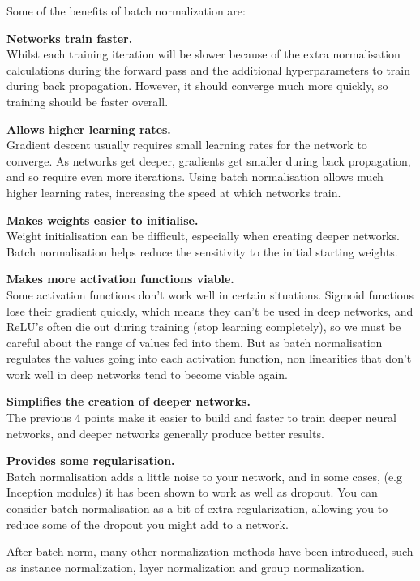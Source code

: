 
Some of the benefits of batch normalization are:
\bit
\item \textbf{Networks train faster.} \\ Whilst each training iteration will be slower because of the extra 
normalisation calculations during the forward pass and the additional hyperparameters to train during back 
propagation. However, it should converge much more quickly, so training should be faster overall.
\item \textbf{Allows higher learning rates.} \\ Gradient descent usually requires small learning rates for the 
network to converge. As networks get deeper, gradients get smaller during back propagation, and so require even more 
iterations. Using batch normalisation allows much higher learning rates, increasing the speed at which networks train.
\item \textbf{Makes weights easier to initialise.} \\ Weight initialisation can be difficult, especially when 
creating deeper networks. Batch normalisation helps reduce the sensitivity to the initial starting weights.
\item \textbf{Makes more activation functions viable.} \\ Some activation functions don't work well in certain 
situations. Sigmoid functions lose their gradient quickly, which means they can't be used in deep networks, and 
ReLU's often die out during training (stop learning completely), so we must be careful about the range of values fed 
into them. But as batch normalisation regulates the values going into each activation function, non linearities that 
don't work well in deep networks tend to become viable again.
\item \textbf{Simplifies the creation of deeper networks.} \\ The previous 4 points make it easier to build and 
faster to train deeper neural networks, and deeper networks generally produce better results.
\item \textbf{Provides some regularisation.} \\ Batch normalisation adds a little noise to your network, and in some 
cases, (e.g Inception modules) it has been shown to work as well as dropout. You can consider batch normalisation as 
a bit of extra regularization, allowing you to reduce some of the dropout you might add to a network. 
\eit

After batch norm, many other normalization methods have been introduced, such as instance normalization, layer 
normalization and group normalization.